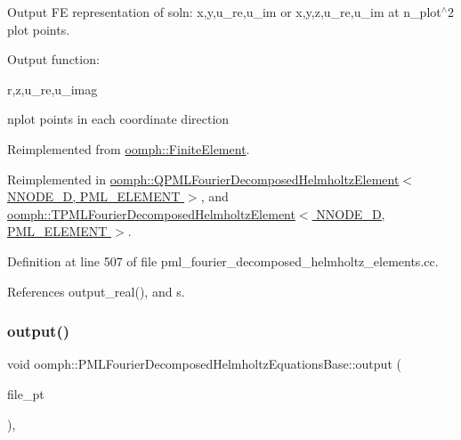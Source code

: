 Output FE representation of soln\+: x,y,u\+\_\+re,u\+\_\+im or x,y,z,u\+\_\+re,u\+\_\+im at n\+\_\+plot$^\wedge$2 plot points. 

Output function\+:

r,z,u\+\_\+re,u\+\_\+imag

nplot points in each coordinate direction 

Reimplemented from \hyperlink{classoomph_1_1FiniteElement_afa9d9b2670f999b43e6679c9dd28c457}{oomph\+::\+Finite\+Element}.



Reimplemented in \hyperlink{classoomph_1_1QPMLFourierDecomposedHelmholtzElement_afc5cf87a0704c5a139abdbd2bdf56e85}{oomph\+::\+Q\+P\+M\+L\+Fourier\+Decomposed\+Helmholtz\+Element$<$ N\+N\+O\+D\+E\+\_\+D, P\+M\+L\+\_\+\+E\+L\+E\+M\+E\+N\+T $>$}, and \hyperlink{classoomph_1_1TPMLFourierDecomposedHelmholtzElement_af0e567c1502be1edd09e7b3378caa1b0}{oomph\+::\+T\+P\+M\+L\+Fourier\+Decomposed\+Helmholtz\+Element$<$ N\+N\+O\+D\+E\+\_\+D, P\+M\+L\+\_\+\+E\+L\+E\+M\+E\+N\+T $>$}.



Definition at line 507 of file pml\+\_\+fourier\+\_\+decomposed\+\_\+helmholtz\+\_\+elements.\+cc.



References output\+\_\+real(), and s.

\mbox{\label{classoomph_1_1PMLFourierDecomposedHelmholtzEquationsBase_a476275fe7a2c10a33e21d17d05ead9fc}} 
\subsubsection{\texorpdfstring{output()}{output()}\hspace{0.1cm}{\footnotesize\ttfamily [3/4]}}
{\footnotesize\ttfamily void oomph\+::\+P\+M\+L\+Fourier\+Decomposed\+Helmholtz\+Equations\+Base\+::output (\begin{DoxyParamCaption}\item[{F\+I\+LE $\ast$}]{file\+\_\+pt }\end{DoxyParamCaption})\hspace{0.3cm}{\ttfamily [inline]}, {\ttfamily [virtual]}}



